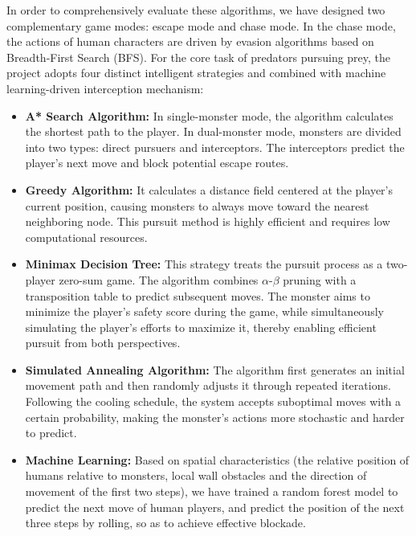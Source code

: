 In order to comprehensively evaluate these algorithms, we have designed two complementary game modes: escape mode and chase mode. In the chase mode, the actions of human characters are driven by evasion algorithms based on Breadth-First Search (BFS). For the core task of predators pursuing prey, the project adopts four distinct intelligent strategies and combined with machine learning-driven interception mechanism:

\begin{itemize}
    \item \textbf{A* Search Algorithm:} In single-monster mode, the algorithm calculates the shortest path to the player. In dual-monster mode, monsters are divided into two types: direct pursuers and interceptors. The interceptors predict the player's next move and block potential escape routes.

    \item \textbf{Greedy Algorithm:} It calculates a distance field centered at the player's current position, causing monsters to always move toward the nearest neighboring node. This pursuit method is highly efficient and requires low computational resources.

    \item \textbf{Minimax Decision Tree:} This strategy treats the pursuit process as a two-player zero-sum game. The algorithm combines $\alpha$-$\beta$ pruning with a transposition table to predict subsequent moves. The monster aims to minimize the player's safety score during the game, while simultaneously simulating the player's efforts to maximize it, thereby enabling efficient pursuit from both perspectives.

    \item \textbf{Simulated Annealing Algorithm:} The algorithm first generates an initial movement path and then randomly adjusts it through repeated iterations. Following the cooling schedule, the system accepts suboptimal moves with a certain probability, making the monster's actions more stochastic and harder to predict.

    \item \textbf{Machine Learning:} Based on spatial characteristics (the relative position of humans relative to monsters, local wall obstacles and the direction of movement of the first two steps), we have trained a random forest model to predict the next move of human players, and predict the position of the next three steps by rolling, so as to achieve effective blockade.
    
\end{itemize}

